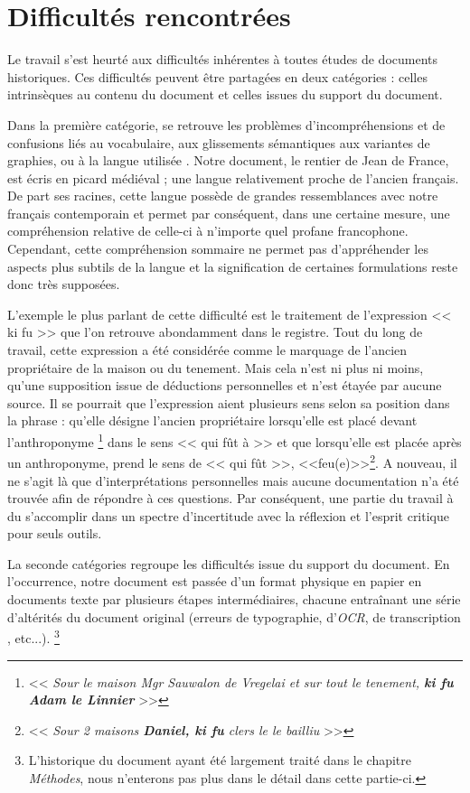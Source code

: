 \section{Difficultés rencontrées}
Le travail s'est heurté aux difficultés inhérentes à toutes études de documents historiques.
Ces difficultés peuvent  être partagées en deux catégories : celles intrinsèques au contenu du document et celles issues du support du document. 

Dans la première catégorie, se retrouve les problèmes d'incompréhensions et de confusions liés au vocabulaire, aux glissements sémantiques aux variantes de graphies, ou à la langue utilisée \parencite{piotrowski_natural_2012}.
Notre document, le rentier de Jean de France, est écris en picard médiéval ; une langue relativement proche de l'ancien français. De part ses racines, cette langue possède de grandes ressemblances avec notre français contemporain et permet par conséquent, dans une certaine mesure, une compréhension relative de celle-ci à n'importe quel profane francophone.
Cependant, cette compréhension sommaire ne permet pas d'appréhender les aspects plus subtils de la langue et la signification de certaines formulations reste donc très supposées. 

L'exemple le plus parlant de cette difficulté est le traitement de l'expression << ki fu >> que l'on retrouve abondamment dans le registre. Tout du long de travail, cette expression a été considérée comme le marquage de l'ancien propriétaire de la maison ou du tenement. Mais cela n'est ni plus ni moins, qu'une supposition issue de déductions personnelles et n'est étayée par aucune source. Il se pourrait que l'expression aient plusieurs sens selon sa position dans la phrase : qu'elle désigne l'ancien propriétaire lorsqu'elle est placé devant l'anthroponyme \footnote{ << \textit{Sour le  maison Mgr Sauwalon de Vregelai et sur tout le tenement, \textbf{ki fu Adam le Linnier}} >>} dans le sens << qui fût à >> et que lorsqu'elle est placée après  un anthroponyme, prend le sens de  << qui fût >>, <<feu(e)>>\footnote{ << \textit{Sour 2 maisons \textbf{Daniel, ki fu} clers le le bailliu} >> }. A nouveau, il ne s'agit là que d'interprétations personnelles mais aucune documentation n'a été trouvée afin de répondre à ces questions. Par conséquent, une partie du travail à du s'accomplir dans un spectre d'incertitude avec la réflexion et l'esprit critique pour seuls outils.

La seconde catégories regroupe les difficultés issue du support du document. 
En l'occurrence, notre document est passée d'un format physique en papier en documents texte par plusieurs étapes intermédiaires, chacune entraînant une série d'altérités du document original (erreurs de typographie, d'\textit{OCR}, de transcription , etc...). \footnote{L'historique du document ayant été  largement traité dans le chapitre \textit{Méthodes}, nous n'enterons pas plus dans le détail dans cette partie-ci.}





